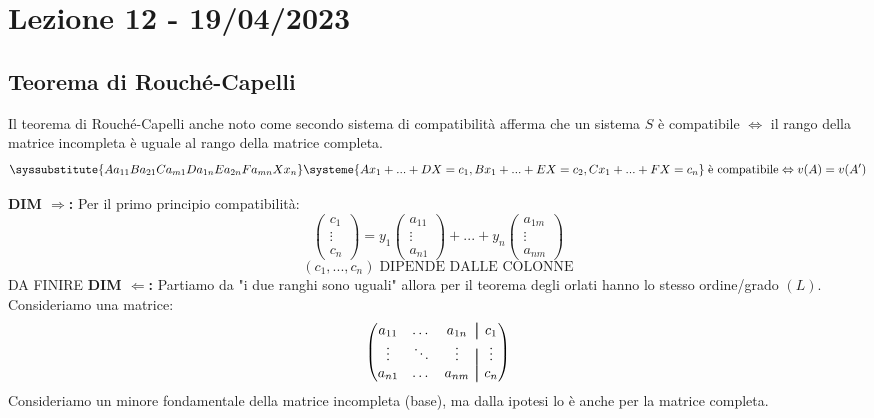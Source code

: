 \section{Lezione 12 - 19/04/2023}

\subsection{Teorema di Rouché-Capelli}
Il teorema di Rouché-Capelli anche noto come secondo sistema di compatibilità afferma che un sistema $S$ è compatibile $\Leftrightarrow$ il rango della matrice incompleta è uguale al rango della matrice completa.
$$
\syssubstitute{A{a_{11}}B{a_{21}}C{a_{m1}}D{a_{1n}}E{a_{2n}}F{a_{mn}}X{x_{n}}}
\systeme{
  A x_1 +...+ D X  = c_1,
  B x_1 +...+ E X = c_2,
  C x_1 +...+ F X = c_n
}
\; \text{è compatibile} \Leftrightarrow
v(A) = v(A^{\prime})
$$

\textbf{DIM $\Rightarrow$:}
Per il primo principio compatibilità:
$$ 
\begin{pmatrix}
c_1 \\ \vdots \\ c_n
\end{pmatrix}
=
y_1 \begin{pmatrix}
a_{11} \\ \vdots \\ a_{n1}
\end{pmatrix}
+...+
y_n \begin{pmatrix}
a_{1m} \\ \vdots \\ a_{nm}
\end{pmatrix}
$$
$$ (c_1,...,c_n) \; \text{DIPENDE DALLE COLONNE}$$
DA FINIRE
\textbf{DIM $\Leftarrow$:}
Partiamo da "i due ranghi sono uguali" allora per il teorema degli orlati hanno lo stesso ordine/grado $(L)$.\\
Consideriamo una matrice:
$$
\begin{pmatrix}
a_{11} & \dots & a_{1n} &\aug& c_1 \\
\vdots & \ddots & \vdots &\aug& \vdots \\
a_{n1} & \dots & a_{nm} &\aug& c_n 
\end{pmatrix}
$$
Consideriamo un minore fondamentale della matrice incompleta (base), ma dalla ipotesi lo è anche per la matrice completa.\\




